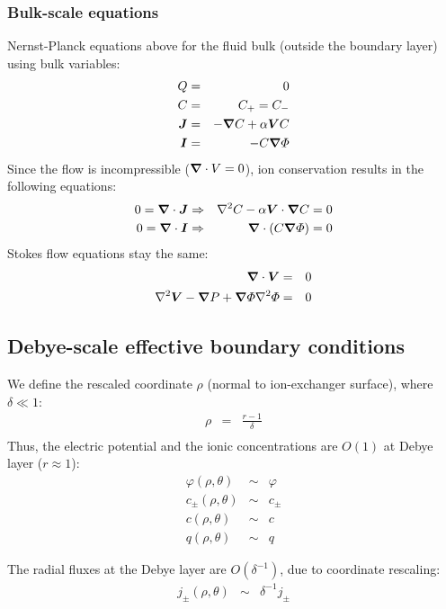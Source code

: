\subsubsection  {Bulk-scale equations}
Nernst-Planck equations above for the fluid bulk (outside
the boundary layer) using bulk variables:
\begin{eqnarray}
Q & = & 0 \\
C & = & C_+ = C_- \\
\boldsymbol{J} &=& -\boldsymbol{\nabla} C + \alpha \boldsymbol{V} C \\
\boldsymbol{I} &=& -C \boldsymbol{\nabla} \varPhi
\end{eqnarray}
Since the flow is incompressible ($\boldsymbol{\nabla} \cdot V = 0$), 
ion conservation results in the following equations:
\begin{eqnarray}
0 = \boldsymbol{\nabla} \cdot \boldsymbol{J} &\Rightarrow& \nabla^2 C - \alpha \boldsymbol{V} \cdot \boldsymbol{\nabla} C = 0 \\
0 = \boldsymbol{\nabla} \cdot \boldsymbol{I} &\Rightarrow& \boldsymbol{\nabla} \cdot \left( C \boldsymbol{\nabla} \varPhi \right) = 0
\end{eqnarray}
Stokes flow equations stay the same:
\begin{eqnarray}
\boldsymbol{\nabla} \cdot \boldsymbol{V} &=& 0 \\
\nabla^2 \boldsymbol{V} - \boldsymbol{\nabla} P + \boldsymbol{\nabla} \varPhi \nabla^2 \varPhi &=& 0
\end{eqnarray}

\subsection{Debye-scale effective boundary conditions}
We define the rescaled coordinate $\rho$ (normal to ion-exchanger surface), where $\delta \ll 1$:
\begin{eqnarray}
\rho &=& \frac{r-1}{\delta} \\
\end{eqnarray}
Thus, the electric potential and the ionic concentrations are $O(1)$ at Debye layer ($r \approx 1$):
\begin{eqnarray}
\varphi(\rho,\theta) &\sim& \varphi \\
c_\pm(\rho,\theta) &\sim& c_\pm \\
c(\rho,\theta) &\sim& c \\
q(\rho,\theta) &\sim& q
\end{eqnarray}

The radial fluxes at the Debye layer are $O(\delta^{-1})$, due to coordinate rescaling:
\begin{eqnarray}
j_\pm(\rho, \theta) &\sim& \delta^{-1} j_\pm
\end{eqnarray}

